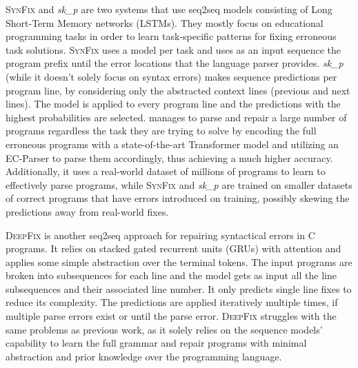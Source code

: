 %
\textsc{SynFix} \citep{Bhatia2016} and \emph{sk\_p} \citep{Pu2016} are two
systems that use seq2seq models consisting of Long Short-Term Memory networks
(LSTMs). They mostly focus on educational programming tasks in order to learn
task-specific patterns for fixing erroneous task solutions. \textsc{SynFix} uses
a model per task and uses as an input sequence the program prefix until the
error locations that the language parser provides. \emph{sk\_p} (while it
doesn't solely focus on syntax errors) makes sequence predictions per program
line, by considering only the abstracted context lines (previous and next
lines). The model is applied to every program line and the predictions with the
highest probabilities are selected. \toolname manages to parse and repair a
large number of programs regardless the task they are trying to solve by
encoding the full erroneous programs with a state-of-the-art Transformer model
and utilizing an EC-Parser to parse them accordingly, thus achieving a much
higher accuracy. Additionally, it uses a real-world dataset of millions of
\python programs to learn to effectively parse programs, while \textsc{SynFix}
and \emph{sk\_p} are trained on smaller datasets of correct programs that have
errors introduced on training, possibly skewing the predictions away from
real-world fixes.

\textsc{DeepFix} \citep{Gupta2017} is another seq2seq approach for repairing
syntactical errors in \textsc{C} programs. It relies on stacked gated recurrent
units (GRUs) with attention and applies some simple abstraction over the
terminal tokens. The input programs are broken into subsequences for each line
and the model gets as input all the line subsequences and their associated line
number. It only predicts single line fixes to reduce its complexity. The
predictions are applied iteratively multiple times, if multiple parse errors
exist or until the parse error. \textsc{DeepFix} struggles with the same
problems as previous work, as it solely relies on the sequence models'
capability to learn the full grammar and repair programs with minimal
abstraction and prior knowledge over the programming language.

